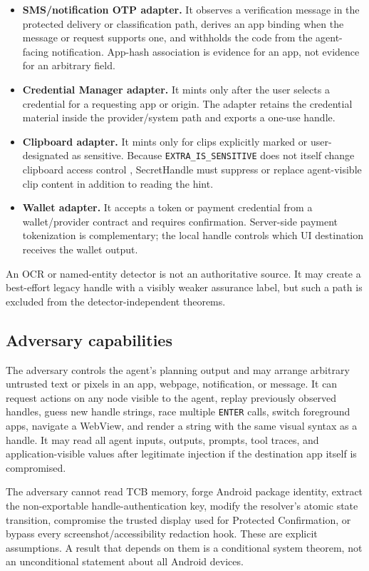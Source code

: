 \begin{itemize}[leftmargin=*]
  \item \textbf{SMS/notification OTP adapter.} It observes a verification message in the protected delivery or classification path, derives an app binding when the message or request supports one, and withholds the code from the agent-facing notification. App-hash association is evidence for an app, not evidence for an arbitrary field.
  \item \textbf{Credential Manager adapter.} It mints only after the user selects a credential for a requesting app or origin. The adapter retains the credential material inside the provider/system path and exports a one-use handle.
  \item \textbf{Clipboard adapter.} It mints only for clips explicitly marked or user-designated as sensitive. Because \texttt{EXTRA\_IS\_SENSITIVE} does not itself change clipboard access control \cite{androidClipboard}, SecretHandle must suppress or replace agent-visible clip content in addition to reading the hint.
  \item \textbf{Wallet adapter.} It accepts a token or payment credential from a wallet/provider contract and requires confirmation. Server-side payment tokenization is complementary; the local handle controls which UI destination receives the wallet output.
\end{itemize}

An OCR or named-entity detector is not an authoritative source. It may create a best-effort legacy handle with a visibly weaker assurance label, but such a path is excluded from the detector-independent theorems.

\subsection{Adversary capabilities}

The adversary controls the agent's planning output and may arrange arbitrary untrusted text or pixels in an app, webpage, notification, or message. It can request actions on any node visible to the agent, replay previously observed handles, guess new handle strings, race multiple \texttt{ENTER} calls, switch foreground apps, navigate a WebView, and render a string with the same visual syntax as a handle. It may read all agent inputs, outputs, prompts, tool traces, and application-visible values after legitimate injection if the destination app itself is compromised.

The adversary cannot read TCB memory, forge Android package identity, extract the non-exportable handle-authentication key, modify the resolver's atomic state transition, compromise the trusted display used for Protected Confirmation, or bypass every screenshot/accessibility redaction hook. These are explicit assumptions. A result that depends on them is a conditional system theorem, not an unconditional statement about all Android devices.

